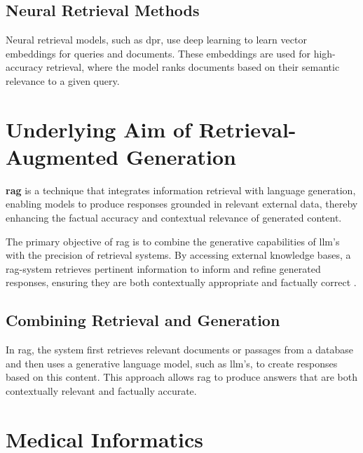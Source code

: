 \subsection{Neural Retrieval Methods}\label{sec:neural-retrieval}
Neural retrieval models, such as \ac{dpr}, use deep learning to learn vector embeddings for queries and documents. These embeddings are used for high-accuracy retrieval, where the model ranks documents based on their semantic relevance to a given query.

\section{Underlying Aim of Retrieval-Augmented Generation}\label{sec:aim-of-rag}

\begin{definition}\label{def:rag}
    \textbf{\ac{rag}} is a technique that integrates information retrieval with language generation, enabling models to produce responses grounded in relevant external data, thereby enhancing the factual accuracy and contextual relevance of generated content.
\end{definition}

The primary objective of \ac{rag} is to combine the generative capabilities of \ac{llm}'s with the precision of retrieval systems. 
By accessing external knowledge bases, a \ac{rag}-system retrieves pertinent information to inform and refine generated responses, ensuring they are both contextually appropriate and factually correct \citep{Lewis2020}.


\subsection{Combining Retrieval and Generation}\label{sec:combining-retrieval-generation}
In \ac{rag}, the system first retrieves relevant documents or passages from a database and then uses a generative language model, such as \ac{llm}'s, to create responses based on this content. This approach allows \ac{rag} to produce answers that are both contextually relevant and factually accurate.


\section{Medical Informatics}\label{sec:medical-informatics}

